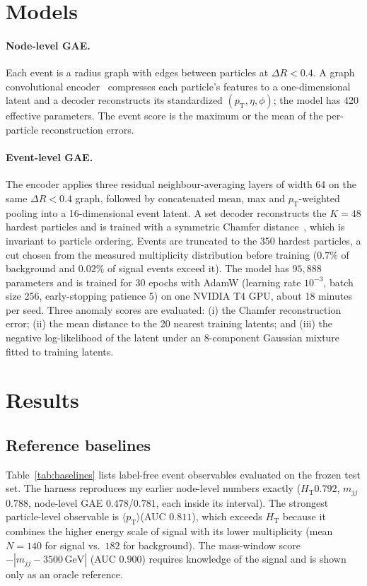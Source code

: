 \documentclass[11pt,a4paper]{article}
\newcommand{\pt}{\ensuremath{p_\mathrm{T}}\xspace}
\newcommand{\HT}{\ensuremath{H_\mathrm{T}}\xspace}
\newcommand{\mjj}{\ensuremath{m_{jj}}\xspace}
\newcommand{\ptmean}{\ensuremath{\langle \pt \rangle}\xspace}
\begin{document}
\section{Models}
\label{sec:models}

\paragraph{Node-level GAE.}
Each event is a radius graph with edges between particles at $\Delta R<0.4$. A graph
convolutional encoder~\cite{Kipf:2016gcn} compresses each particle's features to a one-dimensional
latent and a decoder reconstructs its standardized $(\pt,\eta,\phi)$; the model has 420 effective
parameters. The event score is the maximum or the mean of the per-particle reconstruction
errors.

\paragraph{Event-level GAE.}
The encoder applies three residual neighbour-averaging layers of width 64 on the same
$\Delta R<0.4$ graph, followed by concatenated mean, max and \pt-weighted pooling into a
16-dimensional event latent. A set decoder reconstructs the $K=48$ hardest particles and is
trained with a symmetric Chamfer distance~\cite{Fan:2017chamfer}, which is invariant to particle
ordering. Events are truncated to the 350 hardest particles, a cut chosen from the measured
multiplicity distribution before training ($0.7\%$ of background and $0.02\%$ of signal events
exceed it). The model has $95{,}888$ parameters and is trained for 30 epochs with AdamW
(learning rate $10^{-3}$, batch size 256, early-stopping patience 5) on one NVIDIA T4 GPU,
about 18 minutes per seed. Three anomaly scores are evaluated: (i) the Chamfer reconstruction
error; (ii) the mean distance to the 20 nearest training latents; and (iii) the negative
log-likelihood of the latent under an 8-component Gaussian mixture fitted to training latents.

\section{Results}
\label{sec:results}

\subsection{Reference baselines}

Table~\ref{tab:baselines} lists label-free event observables evaluated on the frozen test set.
The harness reproduces my earlier node-level numbers exactly (\HT $0.792$, \mjj $0.788$,
node-level GAE $0.478$/$0.781$, each inside its interval). The strongest particle-level observable
is \ptmean (AUC $0.811$), which exceeds \HT because it combines the higher energy scale of signal
with its lower multiplicity (mean $N=140$ for signal vs.\ $182$ for background). The
mass-window score $-|\mjj-3500\,\mathrm{GeV}|$ (AUC $0.900$) requires knowledge of the signal and
is shown only as an oracle reference.
\end{document}
